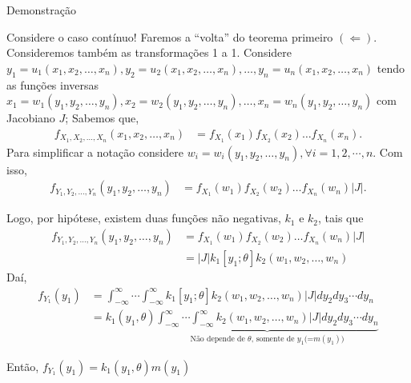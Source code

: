 \documentclass[12pt]{beamer}
\begin{document}
\begin{frame}{Demonstração}
\begin{block}{Considere o caso contínuo!}
\justifying
Faremos a ``volta'' do teorema primeiro $(\Leftarrow{})$. Consideremos também as transformações 1 a 1. Considere $y_1 = u_1(x_1, x_2, \ldots, x_n), y_2 = u_2(x_1, x_2, \ldots, x_n), \ldots, y_n = u_n(x_1, x_2, \ldots, x_n)$ tendo as funções inversas $x_1 = w_1(y_1, y_2, \ldots, y_n), x_2 = w_2(y_1, y_2, \ldots, y_n), \ldots, x_n = w_n(y_1, y_2, \ldots, y_n)$ com Jacobiano $J$; Sabemos que, 
\begin{align*}
    f_{X_{1}, X_{2}, \ldots, X_{n}}(x_{1}, x_{2}, \ldots, x_{n})&=f_{X_{1}}(x_{1})f_{X_{2}}(x_{2})\ldots f_{X_{n}}(x_{n}).
\end{align*}
Para simplificar a notação considere $w_{i}=w_{i}(y_1, y_2, \ldots, y_n),\forall i=1,2,\cdots,n.$ Com isso, 
\begin{align*}
    f_{Y_{1}, Y_{2}, \ldots, Y_{n}}(y_{1}, y_{2}, \ldots, y_{n})&=f_{X_{1}}(w_{1})f_{X_{2}}(w_{2})\ldots f_{X_{n}}(w_{n})|J|.
\end{align*}

\end{block}
\end{frame}

\begin{frame}{}
\begin{block}{}
\justifying
Logo, por hipótese, existem duas funções não negativas, $k_1$ e $k_2$, tais que
\begin{align*}
    f_{Y_{1}, Y_{2}, \ldots, Y_{n}}(y_{1}, y_{2}, \ldots, y_{n})&=f_{X_{1}}(w_{1})f_{X_{2}}(w_{2})\ldots f_{X_{n}}(w_{n})|J|\\
    &=|J|k_1[y_{1}; \theta]k_2(w_1, w_2, \ldots, w_n)
\end{align*}
Daí,
\begin{align*}
    f_{Y_{1}}(y_{1})&=\int_{-\infty}^{\infty}\cdots \int_{-\infty}^{\infty} k_1[y_{1}; \theta]k_2(w_1, w_2, \ldots, w_n)|J|dy_{2}dy_{3}\cdots dy_{n}\\
    &=k_{1}(y_{1},\theta)\underbrace{\int_{-\infty}^{\infty}\cdots \int_{-\infty}^{\infty} k_2(w_1, w_2, \ldots, w_n)|J|dy_{2}dy_{3}\cdots dy_{n}}_{\text{Não depende de $\theta$, somente de $y_{1}$(=$m(y_{1})$)}}
\end{align*}
\end{block}
\pause
\begin{block}{}
\justifying
Então, $f_{Y_{1}}(y_{1})=k_{1}(y_{1},\theta)m(y_{1})$
\end{block}
\end{frame}
\end{document}
